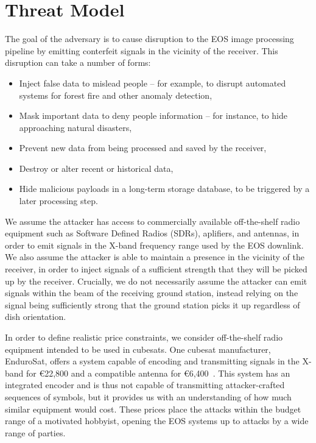 \section{Threat Model}\label{sec:threat-model}

The goal of the adversary is to cause disruption to the EOS image processing pipeline by emitting conterfeit signals in the vicinity of the receiver.
This disruption can take a number of forms:
\begin{itemize}
    \item Inject false data to mislead people -- for example, to disrupt automated systems for forest fire and other anomaly detection,
    \item Mask important data to deny people information -- for instance, to hide approaching natural disasters,
    \item Prevent new data from being processed and saved by the receiver,
    \item Destroy or alter recent or historical data,
    \item Hide malicious payloads in a long-term storage database, to be triggered by a later processing step.
\end{itemize}

We assume the attacker has access to commercially available off-the-shelf radio equipment such as Software Defined Radios (SDRs), aplifiers, and antennas, in order to emit signals in the X-band frequency range used by the EOS downlink.
We also assume the attacker is able to maintain a presence in the vicinity of the receiver, in order to inject signals of a sufficient strength that they will be picked up by the receiver.
Crucially, we do not necessarily assume the attacker can emit signals within the beam of the receiving ground station, instead relying on the signal being sufficiently strong that the ground station picks it up regardless of dish orientation.

In order to define realistic price constraints, we consider off-the-shelf radio equipment intended to be used in cubesats.
One cubesat manufacturer, EnduroSat, offers a system capable of encoding and transmitting signals in the X-band for €22,800 and a compatible antenna for €6,400~\cite{endurosat:xbandtransmitter,endurosat:xbandantenna}.
This system has an integrated encoder and is thus not capable of transmitting attacker-crafted sequences of symbols, but it provides us with an understanding of how much similar equipment would cost.
These prices place the attacks within the budget range of a motivated hobbyist, opening the EOS systems up to attacks by a wide range of parties.

